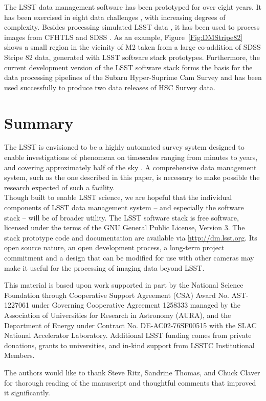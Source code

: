 \documentclass[11pt,twoside]{article}
\begin{document}
The LSST data management software has been prototyped for over eight
years. It has been exercised in eight data challenges \citep[see e.g.][]{2010SPIE.7740E..1OK}, with increasing
degrees of complexity. Besides processing simulated LSST data
\citep{2014SPIE.9150E..14C, 0067-0049-218-1-14}, it
has been used to process images from CFHTLS
and SDSS \citep{2009ApJS..182..543A}. As an example,
Figure~\ref{Fig:DMStripe82} shows a small region in the vicinity of M2
taken from a large co-addition of SDSS Stripe 82 data, generated with LSST
software stack prototypes. Furthermore, the current development version
of the LSST software stack forms the basis for the data processing pipelines
of the Subaru Hyper-Suprime Cam Survey \citep{2012SPIE.8446E..0ZM} and
has been used successfully to produce two data releases of HSC Survey data.
\\

\section{               Summary              }
\label{sec:summary}

The LSST is envisioned to be a highly automated survey system
designed to enable investigations of phenomena on timescales ranging
from minutes to years, and covering approximately half of the sky
\citep{2009arXiv0912.0201L}. A comprehensive data management system,
such as the one described in this paper, is necessary to make possible
the research expected of such a facility.
\\

Though built to enable LSST science, we are hopeful that the individual
components of LSST data management system -- and especially the software
stack -- will be of broader utility.  The LSST software stack is free
software, licensed under the terms of the GNU General Public License,
Version 3.  The stack prototype code and documentation are available via
\url{http://dm.lsst.org}. Its open source nature, an open development process,
a long-term project commitment and a design that can be modified for use
with other cameras may make it useful for the processing of imaging data
beyond LSST.
\\

\acknowledgements

This material is based upon work supported in part by the National
Science Foundation through Cooperative Support Agreement (CSA) Award
No. AST-1227061 under Governing Cooperative Agreement 1258333 managed
by the Association of Universities for Research in Astronomy (AURA),
and the Department of Energy under Contract No. DE-AC02-76SF00515 with
the SLAC National Accelerator Laboratory.  Additional LSST funding
comes from private donations, grants to universities, and in-kind
support from LSSTC Institutional Members.

The authors would like to thank Steve Ritz, Sandrine Thomas, and Chuck
Claver for thorough reading of the manuscript and thoughtful comments
that improved it significantly.

\end{document}
